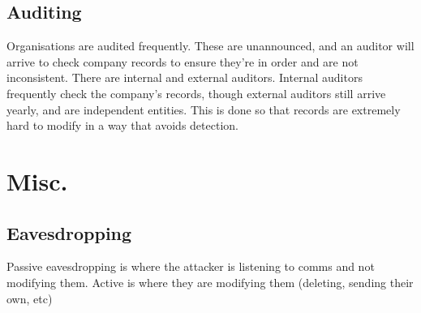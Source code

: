 \documentclass[12pt]{report}
\begin{document}
\section{Auditing}
Organisations are audited frequently. These are unannounced, and an auditor will arrive to check company records to ensure they're in order and
are not inconsistent. There are internal and external auditors. Internal auditors frequently check the company's records, though external auditors still
arrive yearly, and are independent entities. This is done so that records are extremely hard to modify in a way that avoids detection.

\chapter*{Misc.}
\addtocounter{chapter}{-11}
\section{Eavesdropping}
Passive eavesdropping is where the attacker is listening to comms and not modifying them. Active is where they are modifying them (deleting, sending their own, etc)
\end{document}
